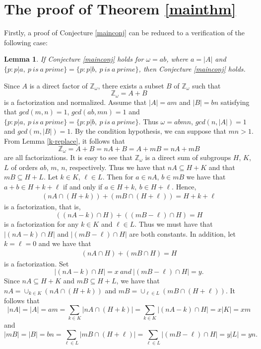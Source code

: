 \documentclass[preprint]{elsarticle}
\newtheorem{lem}[thm]{Lemma}
\begin{document}
\section{The proof of Theorem \ref{mainthm}}

Firstly, a proof of Conjecture \ref{mainconj} can be reduced to a verification of the following case:

\begin{lem} \label{Elemmid}
If Conjecture \ref{mainconj} holds for $\omega=ab$, where $a=|A|$ and $\{p: p|a, \ p \ is \ a \ prime\}=\{p: p|b, \ p \ is \ a \ prime\}$,
then Conjecture \ref{mainconj} holds.
\end{lem}

\pf
Since $A$ is a direct factor of $\mathbb{Z}_{\omega}$, there exists a subset $B$ of $\mathbb{Z}_{\omega}$ such that
$$\mathbb{Z}_{\omega}=A+B$$
is a factorization and normalized.
Assume that $|A|=am$ and $|B|=bn$ satisfying that $gcd(m,n)=1$, $gcd(ab,mn)=1$ and $\{p: p|a, \ p \ is \ a \ prime\}=\{p: p|b, \ p \ is \ a \ prime\}$.
Thus $\omega=abmn$, $gcd(n,|A|)=1$ and $gcd(m,|B|)=1$.
By the condition hypothesis, we can suppose that $mn>1$.
From Lemma \ref{k-replace}, it follows that
$$\mathbb{Z}_{\omega} = A+B=nA + B = A + mB = nA + mB$$ are all factorizations.
It is easy to see that $\mathbb{Z}_{\omega}$ is a direct sum of subgroups $H$, $K$, $L$ of orders $ab$, $m$, $n$, respectively.
Thus we have that $nA\subseteq H +K$ and that $mB\subseteq H +L$.
Let $k\in K$, $\ell\in L$.
Then for $a\in nA$, $b\in mB$ we have that $a + b\in H + k + \ell$ if and only if $a\in H + k, \ b\in H + \ell$.
Hence,
\begin{gather}
(nA\cap (H + k))+(mB\cap (H + \ell))= H + k + \ell   \label{H+k+l-fac}
\end{gather}
is a factorization, that is,
$$((nA-k)\cap H)+((mB-\ell)\cap H)= H$$ is a factorization for any $k\in K$ and $\ell \in L$.
Thus we must have that $|(nA-k)\cap H|$ and $|(mB-\ell)\cap H|$ are both constants.
In addition, let $k=\ell=0$ and we have that
\begin{gather}
(nA\cap H)+(mB\cap H)= H   \label{H-fac}
\end{gather}
is a factorization.
Set $$|(nA-k)\cap H|=x \ and \ |(mB-\ell)\cap H|=y.$$
Since $nA\subseteq H +K$ and $mB\subseteq H +L$,
we have that $nA=\cup_{k\in K}(nA\cap (H+k))$ and $mB=\cup_{\ell\in L}(mB\cap (H+\ell))$.
It follows that $$|nA|=|A|=am=\sum_{k\in K}|nA\cap (H+k)|=\sum_{k\in K}|(nA-k)\cap H|=x|K|=xm$$
and $$|mB|=|B|=bn=\sum_{\ell\in L}|mB\cap (H+\ell)|=\sum_{\ell\in L}|(mB-\ell)\cap H|=y|L|=yn.$$
\end{document}
